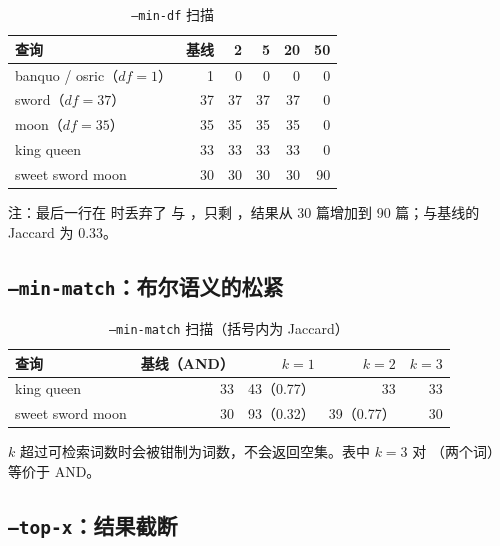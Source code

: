 \begin{table}[H]
  \centering
  \caption{\texttt{--min-df} 扫描}
  \label{tab:min-df}
  \small
  \begin{tabularx}{\linewidth}{@{}X r r r r r@{}}
    \toprule
    查询 & 基线 & 2 & 5 & 20 & 50 \\
    \midrule
    banquo / osric（$df=1$） & 1 & 0 & 0 & 0 & 0 \\
    sword（$df=37$） & 37 & 37 & 37 & 37 & 0 \\
    moon（$df=35$） & 35 & 35 & 35 & 35 & 0 \\
    king queen & 33 & 33 & 33 & 33 & 0 \\
    sweet sword moon & 30 & 30 & 30 & 30 & 90 \\
    \bottomrule
  \end{tabularx}
  \par\smallskip
  \footnotesize 注：最后一行在  时丢弃了  与 ，只剩 ，结果从 30 篇增加到 90 篇；与基线的 Jaccard 为 0.33。
\end{table}

\subsection{\texttt{--min-match}：布尔语义的松紧}

\begin{table}[H]
  \centering
  \caption{\texttt{--min-match} 扫描（括号内为 Jaccard）}
  \label{tab:min-match}
  \small
  \begin{tabularx}{\linewidth}{@{}X r r r r@{}}
    \toprule
    查询 & 基线（AND） & $k=1$ & $k=2$ & $k=3$ \\
    \midrule
    king queen & 33 & 43（0.77） & 33 & 33 \\
    sweet sword moon & 30 & 93（0.32） & 39（0.77） & 30 \\
    \bottomrule
  \end{tabularx}
\end{table}

$k$ 超过可检索词数时会被钳制为词数，不会返回空集。表中 $k=3$ 对 （两个词）等价于 AND。

\subsection{\texttt{--top-x}：结果截断}

